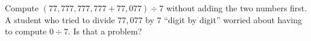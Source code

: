 Compute $\left(77{,}777{,}777{,}777+77{,}077\right)\div7$ without adding the two numbers first. A student who tried to divide $77{,}077$ by $7$ ``digit by digit'' worried about having to compute $0\div7$. Is that a problem?
